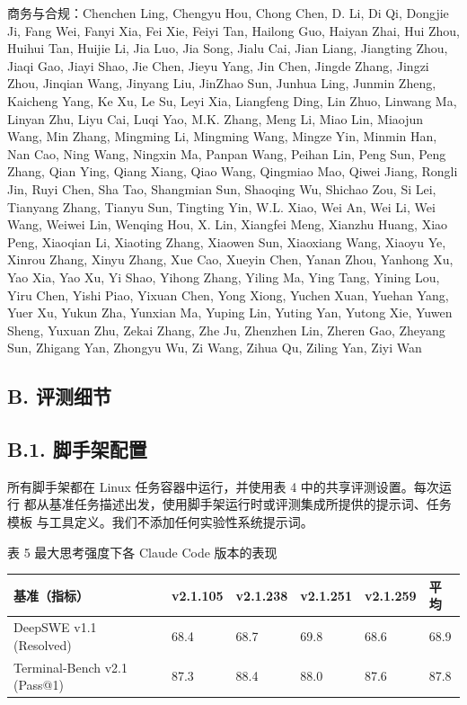 商务与合规：Chenchen Ling, Chengyu Hou, Chong Chen, D. Li,
Di Qi, Dongjie Ji, Fang Wei, Fanyi Xia, Fei Xie, Feiyi Tan, Hailong Guo,
Haiyan Zhai, Hui Zhou, Huihui Tan, Huijie Li, Jia Luo, Jia Song, Jialu
Cai, Jian Liang, Jiangting Zhou, Jiaqi Gao, Jiayi Shao, Jie Chen, Jieyu
Yang, Jin Chen, Jingde Zhang, Jingzi Zhou, Jinqian Wang, Jinyang Liu,
JinZhao Sun, Junhua Ling, Junmin Zheng, Kaicheng Yang, Ke Xu, Le Su,
Leyi Xia, Liangfeng Ding, Lin Zhuo, Linwang Ma, Linyan Zhu, Liyu Cai,
Luqi Yao, M.K. Zhang, Meng Li, Miao Lin, Miaojun Wang, Min Zhang,
Mingming Li, Mingming Wang, Mingze Yin, Minmin Han, Nan Cao, Ning Wang,
Ningxin Ma, Panpan Wang, Peihan Lin, Peng Sun, Peng Zhang, Qian Ying,
Qiang Xiang, Qiao Wang, Qingmiao Mao, Qiwei Jiang, Rongli Jin, Ruyi
Chen, Sha Tao, Shangmian Sun, Shaoqing Wu, Shichao Zou, Si Lei, Tianyang
Zhang, Tianyu Sun, Tingting Yin, W.L. Xiao, Wei An, Wei Li, Wei Wang,
Weiwei Lin, Wenqing Hou, X. Lin, Xiangfei Meng, Xianzhu Huang, Xiao
Peng, Xiaoqian Li, Xiaoting Zhang, Xiaowen Sun, Xiaoxiang Wang, Xiaoyu
Ye, Xinrou Zhang, Xinyu Zhang, Xue Cao, Xueyin Chen, Yanan Zhou, Yanhong
Xu, Yao Xia, Yao Xu, Yi Shao, Yihong Zhang, Yiling Ma, Ying Tang, Yining
Lou, Yiru Chen, Yishi Piao, Yixuan Chen, Yong Xiong, Yuchen Xuan, Yuehan
Yang, Yuer Xu, Yukun Zha, Yunxian Ma, Yuping Lin, Yuting Yan, Yutong
Xie, Yuwen Sheng, Yuxuan Zhu, Zekai Zhang, Zhe Ju, Zhenzhen Lin, Zheren
Gao, Zheyang Sun, Zhigang Yan, Zhongyu Wu, Zi Wang, Zihua Qu, Ziling
Yan, Ziyi Wan

\subsection{B. 评测细节}\label{b.-evaluation-details}

\subsection{B.1. 脚手架配置}\label{b.1.-scaffold-configurations}

所有脚手架都在 Linux 任务容器中运行，并使用表 4 中的共享评测设置。每次运行
都从基准任务描述出发，使用脚手架运行时或评测集成所提供的提示词、任务模板
与工具定义。我们不添加任何实验性系统提示词。



表 5 \textbar{} 最大思考强度下各 Claude Code 版本的表现

{\def\LTcaptype{none} %
\begin{longtable}[]{@{}|l|l|l|l|l|l|@{}}
\toprule\noalign{}
\endhead
\bottomrule\noalign{}
\endlastfoot
\hline
基准（指标） & v2.1.105 & v2.1.238 & v2.1.251 & v2.1.259 & 平均 \\
\hline
DeepSWE v1.1 (Resolved) & 68.4 & 68.7 & 69.8 & 68.6 & 68.9 \\
\hline
Terminal-Bench v2.1 (Pass@1) & 87.3 & 88.4 & 88.0 & 87.6 & 87.8 \\
\hline
\end{longtable}
}


